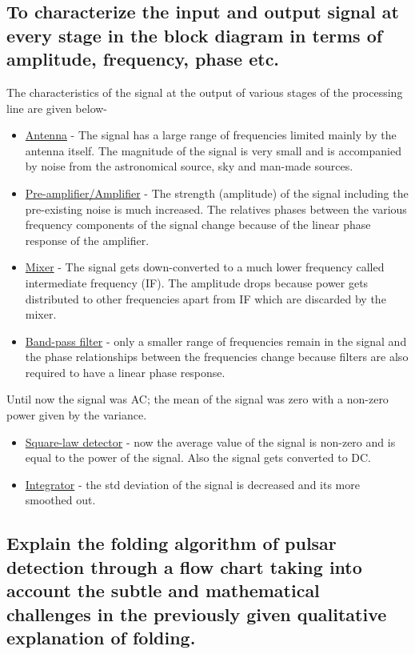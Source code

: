 \documentclass[12pt,a4paper, margin=3in]{article}
\begin{document}
\subsection*{To characterize the input and output signal at every stage in the block diagram in terms of amplitude, frequency, phase etc.}

\large The characteristics of the signal at the output of various stages of the processing line are given below-
\begin{itemize}
    \item \underline{Antenna} - The signal has a large range of frequencies limited mainly by the antenna itself. The magnitude of the signal is very small and is accompanied by noise from the astronomical source, sky and man-made sources.
    \item \underline{Pre-amplifier/Amplifier} - The strength (amplitude) of the signal including the pre-existing noise is much increased. The relatives phases between the various frequency components of the signal change because of the linear phase response of the amplifier.
    \item \underline{Mixer} - The signal gets down-converted to a much lower frequency called intermediate frequency (IF). The amplitude drops because power gets distributed to other frequencies apart from IF which are discarded by the mixer. 
    \item \underline{Band-pass filter} - only a smaller range of frequencies remain in the signal and the phase relationships between the frequencies change because filters are also required to have a linear phase response.
\end{itemize}
Until now the signal was AC; the mean of the signal was zero with a non-zero power given by the variance.
\begin{itemize}
    \item \underline{Square-law detector} - now the average value of the signal is non-zero and is equal to the power of the signal. Also the signal gets converted to DC.
    \item \underline{Integrator} - the std deviation of the signal is decreased and its more smoothed out.  
\end{itemize}

\newpage

\subsection*{Explain the folding algorithm of pulsar detection through a flow chart taking into account the subtle and mathematical challenges in the previously given qualitative explanation of folding.}
\end{document}
